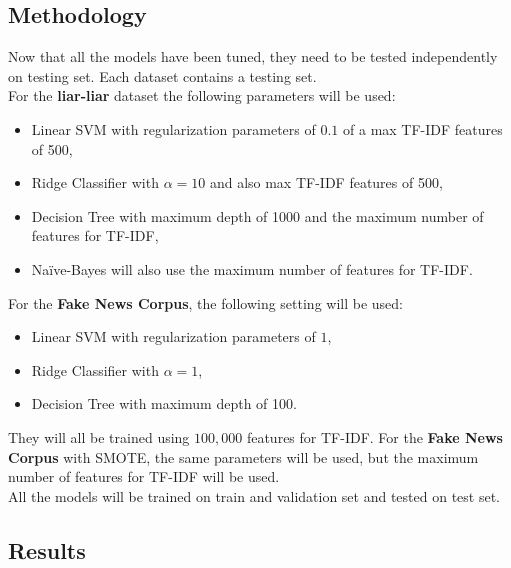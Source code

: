 \subsection{Methodology}
Now that all the models have been tuned, they need to be tested independently on testing set. Each dataset contains a testing set. \\
For the \textbf{liar-liar} dataset the following parameters will be used:
\begin{itemize}
 \item Linear SVM with regularization parameters of $0.1$ of a max TF-IDF features of 500,
 \item Ridge Classifier with $\alpha = 10$ and also max TF-IDF features of 500,
 \item Decision Tree with maximum depth of 1000 and the maximum number of features for TF-IDF,
 \item Na\"{i}ve-Bayes will also use the maximum number of features for TF-IDF.
\end{itemize}
For the \textbf{Fake News Corpus}, the following setting will be used:
\begin{itemize}
 \item Linear SVM with regularization parameters of $1$,
 \item Ridge Classifier with $\alpha = 1$,
 \item Decision Tree with maximum depth of 100.
\end{itemize}
They will all be trained using $100,000$ features for TF-IDF.
For the \textbf{Fake News Corpus} with SMOTE, the same parameters will be used, but the maximum number of features for TF-IDF will be used.\\
All the models will be trained on train and validation set and tested on test set. 
\subsection{Results}
